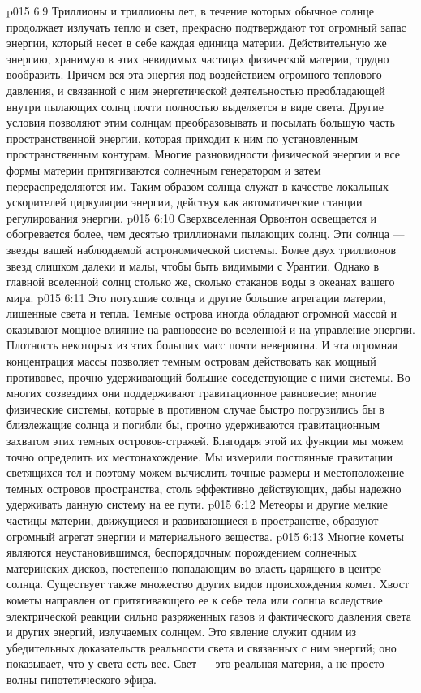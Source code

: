 \vs p015 6:9 Триллионы и триллионы лет, в течение которых обычное солнце продолжает излучать тепло и свет, прекрасно подтверждают тот огромный запас энергии, который несет в себе каждая единица материи. Действительную же энергию, хранимую в этих невидимых частицах физической материи, трудно вообразить. Причем вся эта энергия под воздействием огромного теплового давления, и связанной с ним энергетической деятельностью преобладающей внутри пылающих солнц почти полностью выделяется в виде света. Другие условия позволяют этим солнцам преобразовывать и посылать большую часть пространственной энергии, которая приходит к ним по установленным пространственным контурам. Многие разновидности физической энергии и все формы материи притягиваются солнечным генератором и затем перераспределяются им. Таким образом солнца служат в качестве локальных ускорителей циркуляции энергии, действуя как автоматические станции регулирования энергии.
\vs p015 6:10 Сверхвселенная Орвонтон освещается и обогревается более, чем десятью триллионами пылающих солнц. Эти солнца --- звезды вашей наблюдаемой астрономической системы. Более двух триллионов звезд слишком далеки и малы, чтобы быть видимыми с Урантии. Однако в главной вселенной солнц столько же, сколько стаканов воды в океанах вашего мира.
\vs p015 6:11 \pc {} Это потухшие солнца и другие большие агрегации материи, лишенные света и тепла. Темные острова иногда обладают огромной массой и оказывают мощное влияние на равновесие во вселенной и на управление энергии. Плотность некоторых из этих больших масс почти невероятна. И эта огромная концентрация массы позволяет темным островам действовать как мощный противовес, прочно удерживающий большие соседствующие с ними системы. Во многих созвездиях они поддерживают гравитационное равновесие; многие физические системы, которые в противном случае быстро погрузились бы в близлежащие солнца и погибли бы, прочно удерживаются гравитационным захватом этих темных островов\hyp{}стражей. Благодаря этой их функции мы можем точно определить их местонахождение. Мы измерили постоянные гравитации светящихся тел и поэтому можем вычислить точные размеры и местоположение темных островов пространства, столь эффективно действующих, дабы надежно удерживать данную систему на ее пути.
\vs p015 6:12 \pc {} Метеоры и другие мелкие частицы материи, движущиеся и развивающиеся в пространстве, образуют огромный агрегат энергии и материального вещества.
\vs p015 6:13 Многие кометы являются неустановившимся, беспорядочным порождением солнечных материнских дисков, постепенно попадающим во власть царящего в центре солнца. Существует также множество других видов происхождения комет. Хвост кометы направлен от притягивающего ее к себе тела или солнца вследствие электрической реакции сильно разряженных газов и фактического давления света и других энергий, излучаемых солнцем. Это явление служит одним из убедительных доказательств реальности света и связанных с ним энергий; оно показывает, что у света есть вес. Свет --- это реальная материя, а не просто волны гипотетического эфира.
